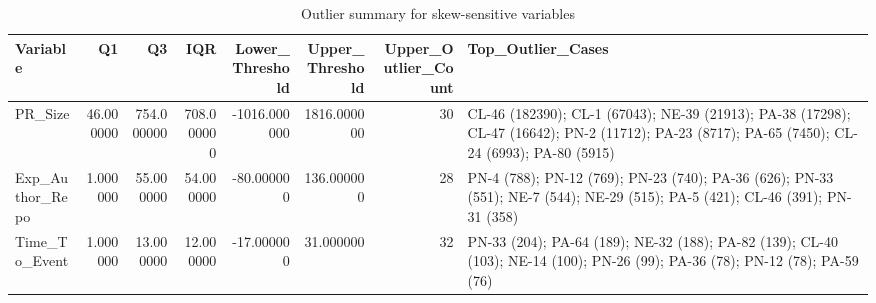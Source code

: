 \begin{table}
\caption{Outlier summary for skew-sensitive variables}
\label{tab:appendix-b-outliers}
\begin{tabular}{lrrrrrrl}
\toprule
Variable & Q1 & Q3 & IQR & Lower\_Threshold & Upper\_Threshold & Upper\_Outlier\_Count & Top\_Outlier\_Cases \\
\midrule
PR\_Size & 46.000000 & 754.000000 & 708.000000 & -1016.000000 & 1816.000000 & 30 & CL-46 (182390); CL-1 (67043); NE-39 (21913); PA-38 (17298); CL-47 (16642); PN-2 (11712); PA-23 (8717); PA-65 (7450); CL-24 (6993); PA-80 (5915) \\
Exp\_Author\_Repo & 1.000000 & 55.000000 & 54.000000 & -80.000000 & 136.000000 & 28 & PN-4 (788); PN-12 (769); PN-23 (740); PA-36 (626); PN-33 (551); NE-7 (544); NE-29 (515); PA-5 (421); CL-46 (391); PN-31 (358) \\
Time\_To\_Event & 1.000000 & 13.000000 & 12.000000 & -17.000000 & 31.000000 & 32 & PN-33 (204); PA-64 (189); NE-32 (188); PA-82 (139); CL-40 (103); NE-14 (100); PN-26 (99); PA-36 (78); PN-12 (78); PA-59 (76) \\
\bottomrule
\end{tabular}
\end{table}
